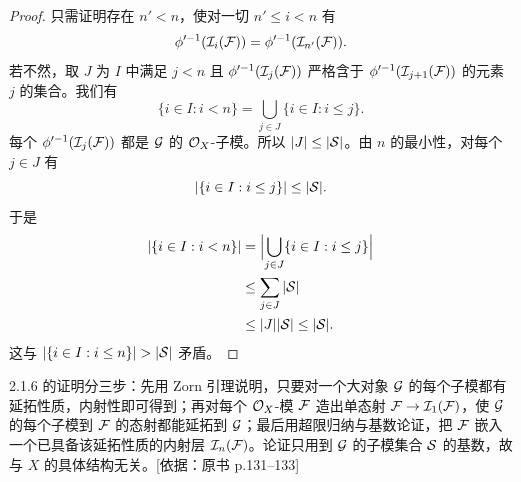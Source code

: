\begin{proof}
只需证明存在 $n'<n$，使对一切 $n'\le i<n$ 有
\[
\phi'^{-1}(\mathcal{I}_i(\mathcal{F}))=\phi'^{-1}(\mathcal{I}_{n'}(\mathcal{F})).
\]
若不然，取 $J$ 为 $I$ 中满足 $j<n$ 且 $\phi'^{-1}(\mathcal{I}_j(\mathcal{F}))$ 严格含于 $\phi'^{-1}(\mathcal{I}_{j+1}(\mathcal{F}))$ 的元素 $j$ 的集合。我们有
\[
\{i\in I : i<n\}=\bigcup_{j\in J}\{i\in I : i\le j\}.
\]
每个 $\phi'^{-1}(\mathcal{I}_j(\mathcal{F}))$ 都是 $\mathcal{G}$ 的 $\mathcal{O}_X$-子模。所以 $|J|\le|\mathcal{S}|$。由 $n$ 的最小性，对每个 $j\in J$ 有
\[
|\{i\in I : i\le j\}|\le|\mathcal{S}|.
\]
于是
\[
\begin{aligned}
|\{i\in I : i<n\}|&=\Bigl|\bigcup_{j\in J}\{i\in I : i\le j\}\Bigr|\\
&\le\sum_{j\in J}|\mathcal{S}|\\
&\le|J||\mathcal{S}|\le|\mathcal{S}|.
\end{aligned}
\]
这与 $|\{i\in I : i\le n\}|>|\cS|$ 矛盾。
\end{proof}
\begin{tnote}
2.1.6 的证明分三步：先用 Zorn 引理说明，只要对一个大对象 $\mathcal{G}$ 的每个子模都有延拓性质，内射性即可得到；再对每个 $\mathcal{O}_X$-模 $\mathcal{F}$ 造出单态射 $\mathcal{F}\to\mathcal{I}_1(\mathcal{F})$，使 $\mathcal{G}$ 的每个子模到 $\mathcal{F}$ 的态射都能延拓到 $\mathcal{G}$；最后用超限归纳与基数论证，把 $\mathcal{F}$ 嵌入一个已具备该延拓性质的内射层 $\mathcal{I}_n(\mathcal{F})$。论证只用到 $\mathcal{G}$ 的子模集合 $\mathcal{S}$ 的基数，故与 $X$ 的具体结构无关。[依据：原书 p.131--133]
\end{tnote}
